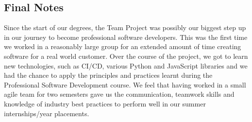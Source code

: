 \documentclass{l3proj}
\begin{document}
\subsection{Final Notes}

Since the start of our degrees, the Team Project was possibly our biggest step up in our journey to become professional software developers. This was the first time we worked in a reasonably large group for an extended amount of time creating software for a real world customer. Over the course of the project, we got to learn new technologies, such as CI/CD, various Python and JavaScript libraries and we had the chance to apply the principles and practices learnt during the Professional Software Development course. We feel that having worked in a small agile team for two semesters gave us the communication, teamwork skills and knowledge of industry best practices to perform well in our summer internships/year placements.



\end{document}
